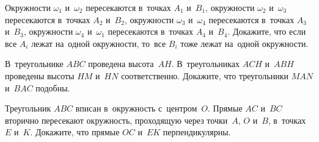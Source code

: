 \begin{problems}
\item
Окружности $\omega_1$ и~$\omega_2$ пересекаются в~точках $A_1$ и~$B_1$,
окружности $\omega_2$ и~$\omega_3$ пересекаются в~точках $A_2$ и~$B_2$,
окружности $\omega_3$ и~$\omega_4$ пересекаются в~точках $A_3$ и~$B_3$,
окружности $\omega_4$ и~$\omega_1$ пересекаются в~точках $A_4$ и~$B_4$.
Докажите, что если все $A_i$ лежат на~одной окружности, то~все $B_i$ тоже
лежат на~одной окружности.

\item
В~треугольнике $ABC$ проведена высота~$AH$.
В~треугольниках $ACH$ и~$ABH$ проведены высоты $HM$ и~$HN$ соответственно.
Докажите, что треугольники $MAN$ и~$BAC$ подобны.

\item
Треугольник $ABC$ вписан в~окружность с~центром~$O$.
Прямые $AC$ и~$BC$ вторично пересекают окружность, проходящую через точки~$A$,
$O$ и~$B$, в~точках $E$ и~$K$.
Докажите, что прямые $OC$ и~$EK$ перпендикулярны.

\end{problems}

